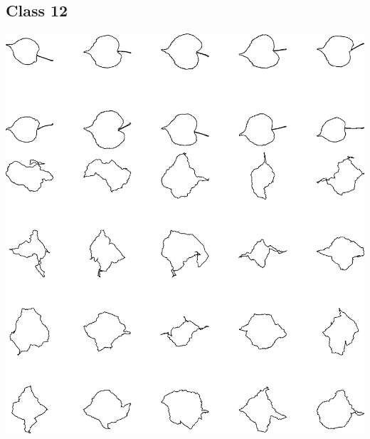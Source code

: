 \documentclass{book}
\begin{document}
\subsection{Class 12}
\includegraphics[width=6in]{output/3.learning/scaled_nts/scaled_nts_training_12.png}
\includegraphics[width=6in]{output/3.learning/scaled_nts/scaled_nts_12.png}
\end{document}

